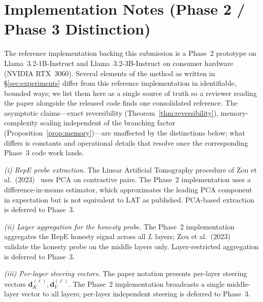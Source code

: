 \section{Implementation Notes (Phase 2 / Phase 3 Distinction)}\label{sec:appendix-impl-notes}

The reference implementation backing this submission is a Phase~2 prototype on Llama~3.2-1B-Instruct and Llama~3.2-3B-Instruct on consumer hardware (NVIDIA RTX~3060). Several elements of the method as written in §\ref{sec:experiments} differ from this reference implementation in identifiable, bounded ways; we list them here as a single source of truth so a reviewer reading the paper alongside the released code finds one consolidated reference. The asymptotic claims---exact reversibility (Theorem~\ref{thm:reversibility}), memory-complexity scaling independent of the branching factor (Proposition~\ref{prop:memory})---are unaffected by the distinctions below; what differs is constants and operational details that resolve once the corresponding Phase~3 code work lands.

\textit{(i) RepE probe extraction.} The Linear Artificial Tomography procedure of Zou et al.\ (2023)~\cite{zou2023repe} uses PCA on contrastive pairs. The Phase~2 implementation uses a difference-in-means estimator, which approximates the leading PCA component in expectation but is not equivalent to LAT as published. PCA-based extraction is deferred to Phase~3.

\textit{(ii) Layer aggregation for the honesty probe.} The Phase~2 implementation aggregates the RepE honesty signal across all $L$ layers; Zou et al.\ (2023)~\cite{zou2023repe} validate the honesty probe on the middle layers only. Layer-restricted aggregation is deferred to Phase~3.

\textit{(iii) Per-layer steering vectors.} The paper notation presents per-layer steering vectors $\mathbf{d}_K^{(\ell)}, \mathbf{d}_V^{(\ell)}$. The Phase~2 implementation broadcasts a single middle-layer vector to all layers; per-layer independent steering is deferred to Phase~3.

